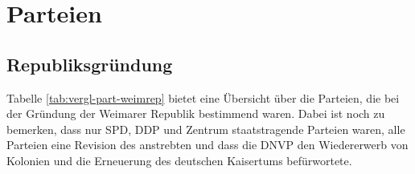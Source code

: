 \section{Parteien}

\subsection*{Republiksgründung}

Tabelle \ref{tab:vergl-part-weimrep} bietet eine Übersicht über die
Parteien, die bei der Gründung der Weimarer Republik bestimmend waren.
Dabei ist noch zu bemerken, dass nur SPD, DDP und Zentrum
staatstragende Parteien waren, alle Parteien eine Revision des
 anstrebten und
dass die DNVP den Wiedererwerb von Kolonien und die Erneuerung des
deutschen Kaisertums befürwortete.

